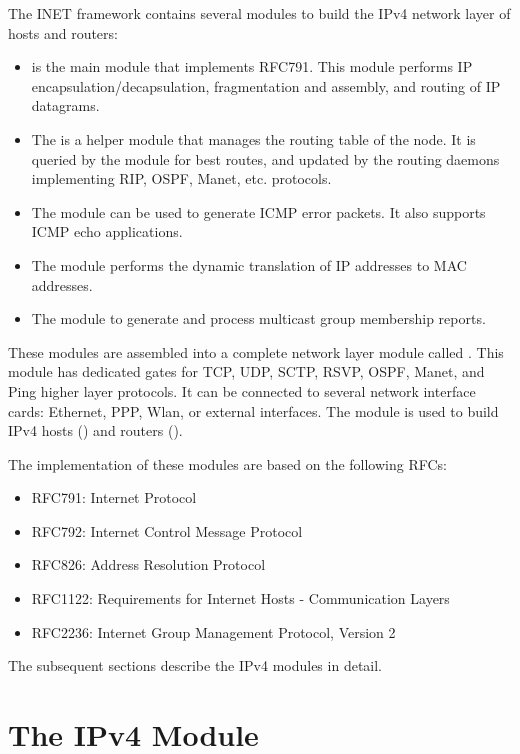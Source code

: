 The INET framework contains several modules to build the
IPv4 network layer of hosts and routers:
\begin{itemize}
  \item {} is the main module that implements RFC791. This
        module performs IP encapsulation/decapsulation, fragmentation
        and assembly, and routing of IP datagrams.
  \item The  is a helper module that manages the routing
        table of the node. It is queried by the  module
        for best routes, and updated by the routing daemons implementing
        RIP, OSPF, Manet, etc. protocols.
  \item The  module can be used to generate ICMP error packets. It also
        supports ICMP echo applications.
  \item The  module performs the dynamic translation of IP addresses
        to MAC addresses.
  \item The  module to generate and process multicast group
        membership reports.
\end{itemize}

These modules are assembled into a complete network layer module
called . This module has
dedicated gates for TCP, UDP, SCTP, RSVP, OSPF, Manet, and Ping
higher layer protocols. It can be connected to several network
interface cards: Ethernet, PPP, Wlan, or external interfaces.
The  module is used to build IPv4 hosts
() and routers ().

The implementation of these modules are based on the following RFCs:
\begin{itemize}
  \item RFC791: Internet Protocol
  \item RFC792: Internet Control Message Protocol
  \item RFC826: Address Resolution Protocol
  \item RFC1122: Requirements for Internet Hosts - Communication Layers
  \item RFC2236: Internet Group Management Protocol, Version 2
\end{itemize}

The subsequent sections describe the IPv4 modules in detail.

\section{The IPv4 Module}

